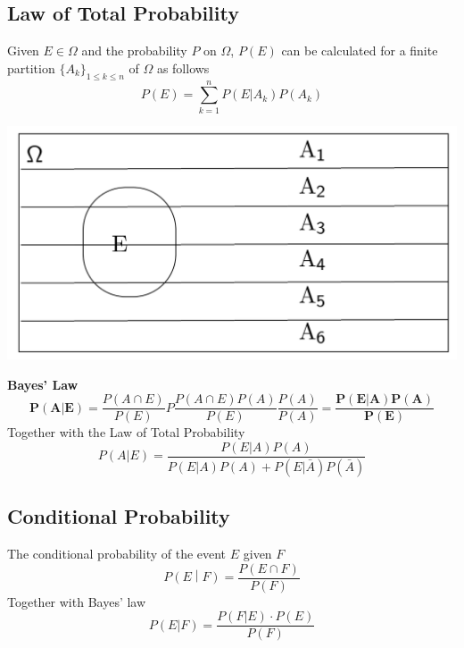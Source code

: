 \documentclass[11pt]{article}
\theoremstyle{definition}
\begin{document}
\subsection{Law of Total Probability}
\begin{minipage}{0.7\linewidth}
	Given $E \in \Omega$ and the probability $P$ on $\Omega$, $P(E)$ can be calculated for a finite partition $\{A_k\}_{1\leq k\leq n}$ of $\Omega$ as follows
	\begin{equation*}
	P(E) = \sum_{k=1}^{n} P(E|A_k)P(A_k)
	\end{equation*}
\end{minipage}
\begin{minipage}{0.3\linewidth}
	\begin{center}
		\includegraphics[width=0.9\linewidth]{img/law_total_probability}
	\end{center}
\end{minipage}

\begin{definition}
	\textbf{Bayes' Law}
	\begin{equation*}
	\textbf{P}(\textbf{A}|\textbf{E}) = \frac{P(A\cap E)}{P(E)} P \frac{P(A\cap E) P(A)}{P(E)}\frac{P(A)}{P(A)} = \frac{\textbf{P}(\textbf{E}|\textbf{A})\textbf{P}(\textbf{A})}{\textbf{P}(\textbf{E})}
	\end{equation*}
	Together with the Law of Total Probability
	\begin{equation*}
		P(A|E) = \frac{P(E|A)P(A)}{P(E|A)P(A) + P(E|\bar{A})P(\bar{A})}
	\end{equation*}
\end{definition}

\subsection{Conditional Probability}
\begin{definition}
	The conditional probability of the event $E$ given $F$
	\begin{equation*}
		P\left( E \middle| F \right) = \frac{P(E\cap F)}{P(F)}
	\end{equation*}
	Together with Bayes' law
	\begin{equation*}
		P(E|F) = \frac{P(F|E)\cdot P(E)}{P(F)}
	\end{equation*}
\end{definition}
\end{document}
